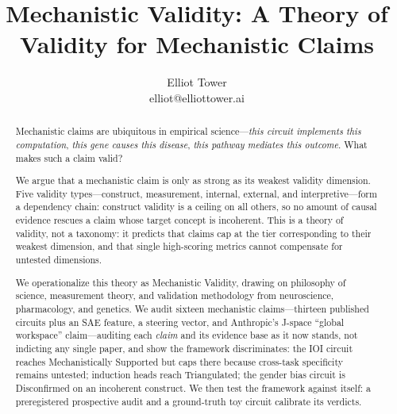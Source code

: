 \documentclass{article}
\title{Mechanistic Validity: A Theory of Validity for Mechanistic Claims}
\author{\name Elliot Tower \\
      \email elliot@elliottower.ai}
\newcommand{\TODO}[1]{\par\smallskip\noindent\textcolor{red}{\textbf{[\,TODO}}\ \textit{\textcolor{black!65}{#1}}\ \textcolor{red}{\textbf{TODO\,]}}\par\smallskip}
\begin{document}
\maketitle

\begin{abstract}
Mechanistic claims are ubiquitous in empirical science---\emph{this circuit implements this computation}, \emph{this gene causes this disease}, \emph{this pathway mediates this outcome}. What makes such a claim valid?

We argue that a mechanistic claim is only as strong as its weakest validity dimension. Five validity types---construct, measurement, internal, external, and interpretive---form a dependency chain: construct validity is a ceiling on all others, so no amount of causal evidence rescues a claim whose target concept is incoherent. This is a theory of validity, not a taxonomy: it predicts that claims cap at the tier corresponding to their weakest dimension, and that single high-scoring metrics cannot compensate for untested dimensions.

We operationalize this theory as Mechanistic Validity, drawing on philosophy of science, measurement theory, and validation methodology from neuroscience, pharmacology, and genetics. We audit sixteen mechanistic claims---thirteen published circuits plus an SAE feature, a steering vector, and Anthropic's J-space ``global workspace'' claim---auditing each \emph{claim} and its evidence base as it now stands, not indicting any single paper, and show the framework discriminates: the IOI circuit reaches Mechanistically Supported but caps there because cross-task specificity remains untested; induction heads reach Triangulated; the gender bias circuit is Disconfirmed on an incoherent construct. We then test the framework against itself: a preregistered prospective audit and a ground-truth toy circuit calibrate its verdicts.
\end{abstract}

\end{document}
